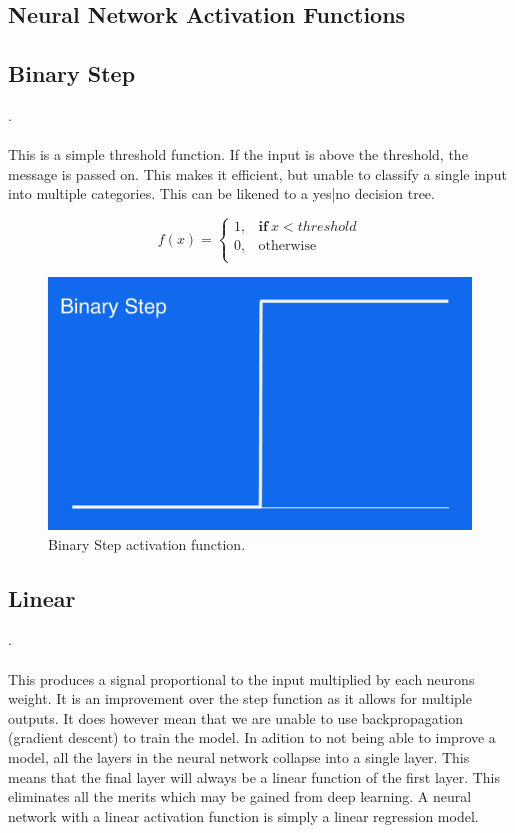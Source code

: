\begin{appendices}
\chapter{Neural Network Activation Functions}\label{appendix:activation}


\section{Binary Step}.\\\\
This is a simple threshold function. If the input is above the threshold, the message is passed on. This makes it efficient, but unable to classify a single input into multiple categories. This can be likened to a yes|no decision tree.

\begin{equation}
f(x) =
    \begin{cases}
      1 , & \mathbf{if} \ x < threshold \\
      0 , & \text{otherwise}\\

    \end{cases}
  \end{equation}

\begin{figure}[H]
\centering
\includegraphics[width=.265\textwidth]{4fig/binary.png}
\caption{Binary Step activation function.}
\end{figure}



\section{Linear}.\\\\

This produces a signal proportional to the input multiplied by each neurons weight. It is an improvement over the step function as it allows for multiple outputs. It does however mean that we are unable to use backpropagation (gradient descent) to train the model. In adition to not being able to improve a model, all the layers in the neural network collapse into a single layer. This means that the final layer will always be a linear function of the first layer. This eliminates all the merits which may be gained from deep learning. A neural network with a linear activation function is simply a linear regression model.


\end{appendices}

